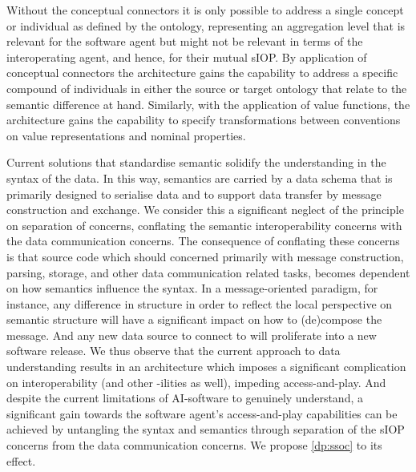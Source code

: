\documentclass[sort&compress,preprint,authoryear,3p,twocolumn]{elsarticle}
\begin{document}
Without the conceptual connectors it is only possible to address a
single concept or individual as defined by the ontology, representing an
aggregation level that is relevant for the software agent but might not
be relevant in terms of the interoperating agent, and hence, for their
mutual sIOP. By application of conceptual connectors the architecture
gains the capability to address a specific compound of individuals in
either the source or target ontology that relate to the semantic
difference at hand. Similarly, with the application of value functions,
the architecture gains the capability to specify transformations between
conventions on value representations and nominal properties.

Current solutions that standardise semantic solidify the understanding
in the syntax of the data. In this way, semantics are carried by a data
schema that is primarily designed to serialise data and to support data
transfer by message construction and exchange. We consider this a
significant neglect of the principle on separation of concerns,
conflating the semantic interoperability concerns with the data
communication concerns. The consequence of conflating these concerns is
that source code which should concerned primarily with message
construction, parsing, storage, and other data communication related
tasks, becomes dependent on how semantics influence the syntax. In a
message-oriented paradigm, for instance, any difference in structure in
order to reflect the local perspective on semantic structure will have a
significant impact on how to (de)compose the message. And any new data
source to connect to will proliferate into a new software release. We
thus observe that the current approach to data understanding results in
an architecture which imposes a significant complication on
interoperability (and other -ilities as well), impeding access-and-play.
And despite the current limitations of AI-software to genuinely
understand, a significant gain towards the software agent's
access-and-play capabilities can be achieved by untangling the syntax
and semantics through separation of the sIOP concerns from the data
communication concerns. We propose \cref{dp:ssoc} to its effect.
\end{document}

